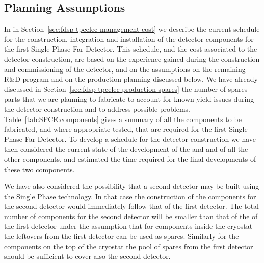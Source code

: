 \subsection{Planning Assumptions}
\label{sec:fdsp-tpcelec-management-planning}

In in Section~\ref{sec:fdsp-tpcelec-management-cost} we describe
the current schedule for the construction, integration and installation
of the  detector components for the first Single
Phase  Far Detector. This schedule, and the cost associated
to the detector construction, are based on the experience gained
during the construction and commissioning of the 
detector, and on the assumptions on the remaining R\&D program
and on the production planning discussed below. 
We have already discussed in Section~\ref{sec:fdsp-tpcelec-production-spares}
the number of spares parts that we are planning to fabricate to
account for known yield issues during the detector construction
and to address possible problems. Table~\ref{tab:SPCE:components}
gives a summary of all the components to be fabricated, and where
appropriate tested, that are required for the first Single Phase
 Far Detector. To develop a schedule for the detector construction 
we have then considered the current state of the development of 
the  and  and of all the other components, 
and estimated the time required for the final developments of these
two components.

We have also considered the possibility that a second detector may
be built using the Single Phase technology. In that case the construction
of the  components for the second detector would
immediately follow that of the first detector. The total number of
components for the second detector will be smaller than that of the
of the first detector under the assumption that for components inside
the cryostat the leftovers from the first detector can be used as
spares. Similarly for the components on the top of the cryostat the
pool of spares from the first detector should be sufficient to cover
also the second detector.

